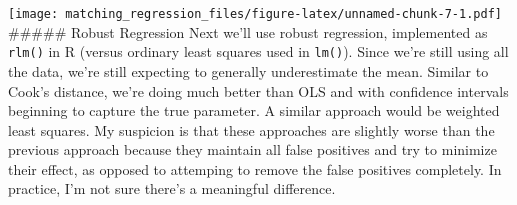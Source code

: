 \documentclass[
]{article}
\newenvironment{Shaded}{\begin{snugshade}}{\end{snugshade}}
\newcommand{\ControlFlowTok}[1]{\textcolor[rgb]{0.13,0.29,0.53}{\textbf{#1}}}
\newcommand{\DataTypeTok}[1]{\textcolor[rgb]{0.13,0.29,0.53}{#1}}
\newcommand{\DecValTok}[1]{\textcolor[rgb]{0.00,0.00,0.81}{#1}}
\newcommand{\FloatTok}[1]{\textcolor[rgb]{0.00,0.00,0.81}{#1}}
\newcommand{\KeywordTok}[1]{\textcolor[rgb]{0.13,0.29,0.53}{\textbf{#1}}}
\newcommand{\NormalTok}[1]{#1}
\newcommand{\OperatorTok}[1]{\textcolor[rgb]{0.81,0.36,0.00}{\textbf{#1}}}
\newcommand{\StringTok}[1]{\textcolor[rgb]{0.31,0.60,0.02}{#1}}
\begin{document}
\begin{Shaded}
\end{Shaded}

\texttt{[image: matching\_regression\_files/figure-latex/unnamed-chunk-7-1.pdf]}
\#\#\#\#\# Robust Regression Next we'll use robust regression,
implemented as \texttt{rlm()} in R (versus ordinary least squares used
in \texttt{lm()}). Since we're still using all the data, we're still
expecting to generally underestimate the mean. Similar to Cook's
distance, we're doing much better than OLS and with confidence intervals
beginning to capture the true parameter. A similar approach would be
weighted least squares. My suspicion is that these approaches are
slightly worse than the previous approach because they maintain all
false positives and try to minimize their effect, as opposed to
attemping to remove the false positives completely. In practice, I'm not
sure there's a meaningful difference.
\end{document}
